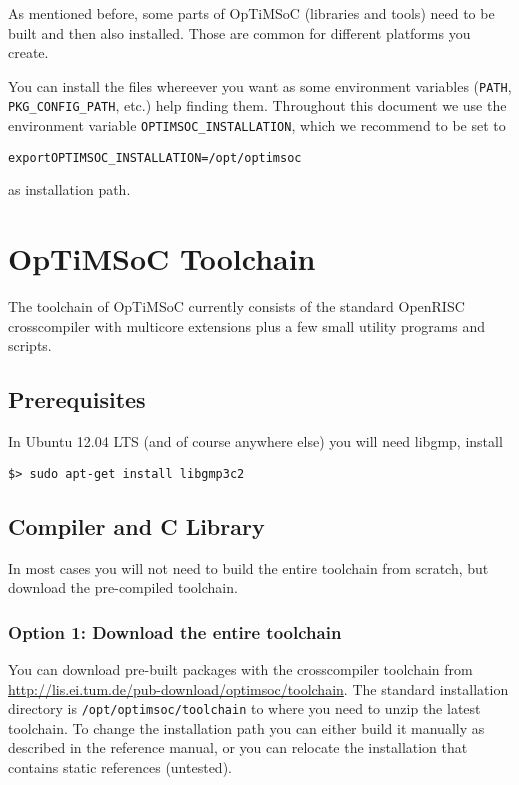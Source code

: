 As mentioned before, some parts of OpTiMSoC (libraries and tools) need
to be built and then also installed. Those are common for different
platforms you create.

You can install the files whereever you want as some environment
variables (\verb|PATH|, \verb|PKG_CONFIG_PATH|, etc.) help finding
them. Throughout this document we use the environment variable
\verb|OPTIMSOC_INSTALLATION|, which we recommend to be set to

\begin{alltt}
export OPTIMSOC_INSTALLATION=/opt/optimsoc
\end{alltt}

as installation path.

\section{OpTiMSoC Toolchain}

The toolchain of OpTiMSoC currently consists of the standard OpenRISC
crosscompiler with multicore extensions plus a few small utility
programs and scripts.

\subsection{Prerequisites}

In Ubuntu 12.04 LTS (and of course anywhere else) you will need
libgmp, install

\begin{verbatim}
$> sudo apt-get install libgmp3c2
\end{verbatim}

\subsection{Compiler and C Library}

In most cases you will not need to build the entire toolchain from
scratch, but download the pre-compiled toolchain.

\subsubsection{Option 1: Download the entire toolchain}

You can download pre-built packages with the crosscompiler toolchain
from \url{http://lis.ei.tum.de/pub-download/optimsoc/toolchain}. The
standard installation directory is \verb|/opt/optimsoc/toolchain| to
where you need to unzip the latest toolchain. To change the
installation path you can either build it manually as described in the
reference manual, or you can relocate the installation that contains
static references (untested).

